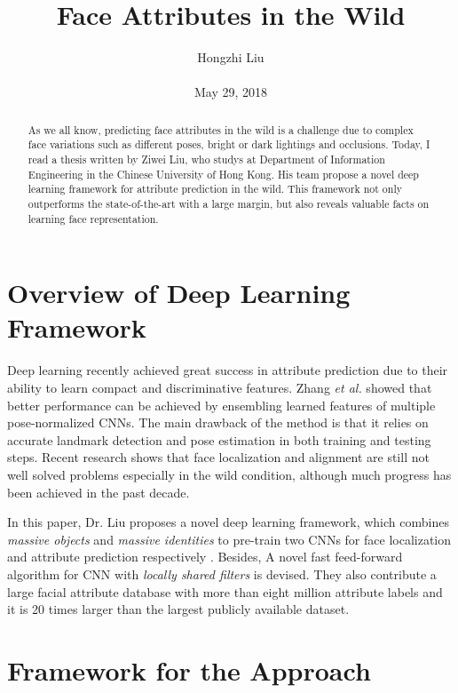 \documentclass[10pt,twocolumn,letterpaper]{article}
\title{Face Attributes in the Wild}
\author{Hongzhi Liu\\\\
May 29, 2018}
\begin{document}
\maketitle
\begin{abstract}
	As we all know, predicting face attributes in the wild is a challenge due to complex face variations such as different poses, bright or dark lightings and occlusions. Today, I read a thesis written by Ziwei Liu, who studys at Department of Information Engineering in the Chinese University of Hong Kong. His team propose a novel deep learning framework for attribute prediction in the wild. This framework not only outperforms the state-of-the-art with a large margin, but also reveals valuable facts on learning face representation.

\end{abstract}
\section{Overview of Deep Learning Framework}

Deep learning recently achieved great success in attribute prediction due to their ability to learn compact and discriminative features. Zhang \emph{et al.}\cite{Zhang2014PANDA} showed that better performance can be achieved by ensembling learned features of multiple pose-normalized CNNs. The main drawback of the method is that it relies on accurate landmark detection and pose estimation in both training and testing steps. Recent research shows that face localization and alignment are still not well solved problems especially in the wild condition, although much progress has been achieved in the past decade. 

In this paper, Dr. Liu proposes a novel deep learning framework, which combines \emph{massive objects} and \emph{massive identities} to pre-train two CNNs for face localization and attribute prediction respectively \cite{DBLP:conf/iccv/LiuLWT15}. Besides, A novel fast feed-forward algorithm for CNN with \emph{locally shared filters} is devised. They also contribute a large facial attribute database with more than eight million attribute labels and it is 20 times larger than the largest publicly available dataset.

\section{Framework for the Approach}
\end{document}
